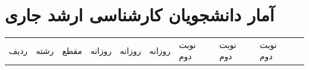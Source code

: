 \documentclass[
  letterpaper,
  DIV=11,
  numbers=noendperiod]{scrreprt}
\newcounter{none} %
\begin{document}
\section{آمار دانشجویان کارشناسی ارشد
جاری}\label{ux622ux645ux627ux631-ux62fux627ux646ux634ux62cux648ux6ccux627ux646-ux6a9ux627ux631ux634ux646ux627ux633ux6cc-ux627ux631ux634ux62f-ux62cux627ux631ux6cc}

{\def\LTcaptype{none} %
\begin{longtable}[]{@{}
  >{\raggedright\arraybackslash}p{}
  >{\raggedright\arraybackslash}p{}
  >{\raggedright\arraybackslash}p{}
  >{\raggedright\arraybackslash}p{}
  >{\raggedright\arraybackslash}p{}
  >{\raggedright\arraybackslash}p{}
  >{\raggedright\arraybackslash}p{}
  >{\raggedright\arraybackslash}p{}
  >{\raggedright\arraybackslash}p{}
  >{\raggedright\arraybackslash}p{}@{}}
\toprule\noalign{}
\begin{minipage}[b]{\linewidth}\raggedright
ردیف
\end{minipage} & \begin{minipage}[b]{\linewidth}\raggedright
رشته
\end{minipage} & \begin{minipage}[b]{\linewidth}\raggedright
مقطع
\end{minipage} & \begin{minipage}[b]{\linewidth}\raggedright
روزانه
\end{minipage} & \begin{minipage}[b]{\linewidth}\raggedright
روزانه
\end{minipage} & \begin{minipage}[b]{\linewidth}\raggedright
روزانه
\end{minipage} & \begin{minipage}[b]{\linewidth}\raggedright
نوبت دوم
\end{minipage} & \begin{minipage}[b]{\linewidth}\raggedright
نوبت دوم
\end{minipage} & \begin{minipage}[b]{\linewidth}\raggedright
نوبت دوم

\end{minipage}
\end{longtable}}
\end{document}

